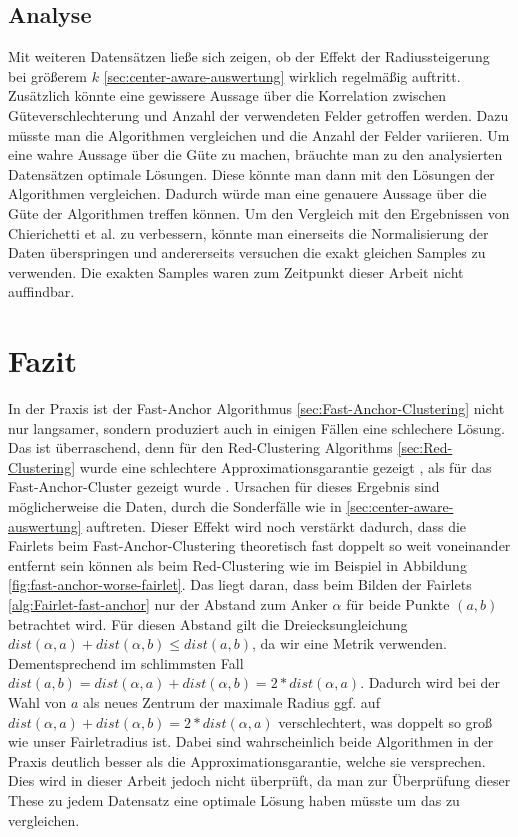     \subsection{Analyse}
        Mit weiteren Datensätzen ließe sich zeigen, ob der Effekt der Radiussteigerung bei größerem $k$ \ref{sec:center-aware-auswertung} wirklich regelmäßig auftritt. Zusätzlich könnte eine gewissere Aussage über die Korrelation zwischen Güteverschlechterung und Anzahl der verwendeten Felder getroffen werden. Dazu müsste man die Algorithmen vergleichen und die Anzahl der Felder variieren. \newline
        Um eine wahre Aussage über die Güte zu machen, bräuchte man zu den analysierten Datensätzen optimale Lösungen. Diese könnte man dann mit den Lösungen der Algorithmen vergleichen. Dadurch würde man eine genauere Aussage über die Güte der Algorithmen treffen können. \newline
        Um den Vergleich mit den Ergebnissen von Chierichetti et al. \cite{chierichetti2018fair} zu verbessern, könnte man einerseits die Normalisierung der Daten überspringen und andererseits versuchen die exakt gleichen Samples zu verwenden. Die exakten Samples waren zum Zeitpunkt dieser Arbeit nicht auffindbar.

\section{Fazit}
    In der Praxis ist der Fast-Anchor Algorithmus \ref{sec:Fast-Anchor-Clustering} nicht nur langsamer, sondern produziert auch in einigen Fällen eine schlechere Lösung. Das ist überraschend, denn für den Red-Clustering Algorithms \ref{sec:Red-Clustering} wurde eine schlechtere Approximationsgarantie gezeigt \cite{chierichetti2018fair}, als für das Fast-Anchor-Cluster gezeigt wurde \cite{BA_Clustering_Irina}. \newline
    Ursachen für dieses Ergebnis sind möglicherweise die Daten, durch die Sonderfälle wie in \ref{sec:center-aware-auswertung} auftreten. Dieser Effekt wird noch verstärkt dadurch, dass die Fairlets beim Fast-Anchor-Clustering theoretisch fast doppelt so weit voneinander entfernt sein können als beim Red-Clustering wie im Beispiel in Abbildung \ref{fig:fast-anchor-worse-fairlet}. Das liegt daran, dass beim Bilden der Fairlets \ref{alg:Fairlet-fast-anchor} nur der Abstand zum Anker $\alpha$ für beide Punkte $(a, b)$ betrachtet wird. Für diesen Abstand gilt die Dreiecksungleichung $dist(\alpha, a) + dist(\alpha, b) \leq dist(a, b)$, da wir eine Metrik verwenden. Dementsprechend im schlimmsten Fall $dist(a, b) = dist(\alpha, a) + dist(\alpha, b) = 2 * dist(\alpha, a)$. Dadurch wird bei der Wahl von $a$ als neues Zentrum der maximale Radius ggf. auf $dist(\alpha, a) + dist(\alpha, b) = 2 * dist(\alpha, a)$ verschlechtert, was doppelt so groß wie unser Fairletradius ist. \newline
    Dabei sind wahrscheinlich beide Algorithmen in der Praxis deutlich besser als die Approximationsgarantie, welche sie versprechen. Dies wird in dieser Arbeit jedoch nicht überprüft, da man zur Überprüfung dieser These zu jedem Datensatz eine optimale Lösung haben müsste um das zu vergleichen.
